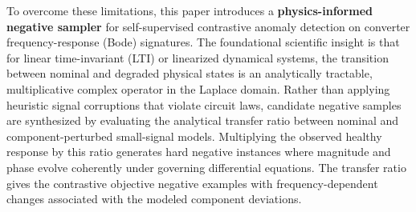 \documentclass[11pt,a4paper]{article}
\begin{document}
To overcome these limitations, this paper introduces a \textbf{physics-informed negative sampler} for self-supervised contrastive anomaly detection on converter frequency-response (Bode) signatures. The foundational scientific insight is that for linear time-invariant (LTI) or linearized dynamical systems, the transition between nominal and degraded physical states is an analytically tractable, multiplicative complex operator in the Laplace domain. Rather than applying heuristic signal corruptions that violate circuit laws, candidate negative samples are synthesized by evaluating the analytical transfer ratio between nominal and component-perturbed small-signal models. Multiplying the observed healthy response by this ratio generates hard negative instances where magnitude and phase evolve coherently under governing differential equations. The transfer ratio gives the contrastive objective negative examples with frequency-dependent changes associated with the modeled component deviations.
\end{document}
